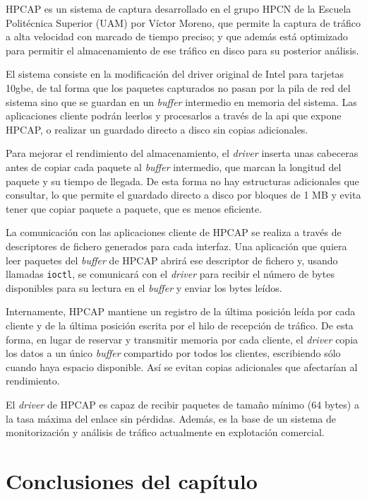 \documentclass[twoside, 12pt]{epstfg}
\begin{document}
HPCAP \cite{victorPhD} es un sistema de captura desarrollado en el grupo HPCN de la Escuela Politécnica Superior (UAM) por Víctor Moreno, que permite la captura de tráfico a alta velocidad con marcado de tiempo preciso; y que además está optimizado para permitir el almacenamiento de ese tráfico en disco para su posterior análisis.

El sistema consiste en la modificación del \gls{driver} original de Intel para tarjetas \gls{10gbe}, de tal forma que los paquetes capturados no pasan por la pila de red del sistema sino que se guardan en un \textit{buffer} intermedio en memoria del sistema. Las aplicaciones cliente podrán leerlos y procesarlos a través de la \gls{api} que expone HPCAP, o realizar un guardado directo a disco sin copias adicionales.

Para mejorar el rendimiento del almacenamiento, el \textit{driver} inserta unas cabeceras antes de copiar cada paquete al \textit{buffer} intermedio, que marcan la longitud del paquete y su tiempo de llegada. De esta forma no hay estructuras adicionales que consultar, lo que permite el guardado directo a disco por bloques de 1 MB y evita tener que copiar paquete a paquete, que es menos eficiente.

La comunicación con las aplicaciones cliente de HPCAP se realiza a través de descriptores de fichero generados para cada interfaz. Una aplicación que quiera leer paquetes del \textit{buffer} de HPCAP abrirá ese descriptor de fichero y, usando llamadas \texttt{ioctl}, se comunicará con el \textit{driver} para recibir el número de bytes disponibles para su lectura en el \textit{buffer} y enviar los bytes leídos.

Internamente, HPCAP mantiene un registro de la última posición leída por cada cliente y de la última posición escrita por el hilo de recepción de tráfico. De esta forma, en lugar de reservar y transmitir memoria por cada cliente, el \textit{driver} copia los datos a un único \textit{buffer} compartido por todos los clientes, escribiendo sólo cuando haya espacio disponible. Así se evitan copias adicionales que afectarían al rendimiento.

El \textit{driver} de HPCAP es capaz de recibir paquetes de tamaño mínimo (64 bytes) a la tasa máxima del enlace sin pérdidas. Además, es la base de un sistema de monitorización y análisis de tráfico \cite{m3omon} actualmente en explotación comercial.

\section{Conclusiones del capítulo}
\end{document}
